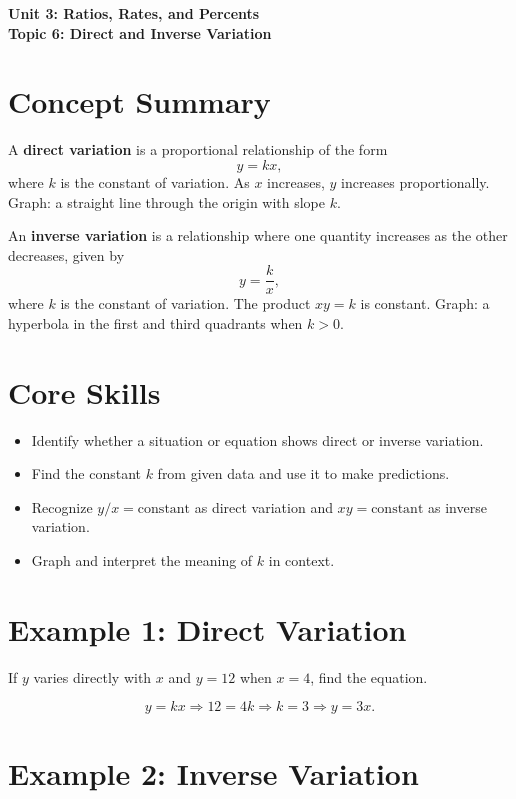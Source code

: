 \documentclass[12pt]{article}
\begin{document}
\begin{center}
    \LARGE \textbf{Unit 3: Ratios, Rates, and Percents} \\[6pt]
    \Large \textbf{Topic 6: Direct and Inverse Variation}
\end{center}

\vspace{1em}

\section*{Concept Summary}

A \textbf{direct variation} is a proportional relationship of the form
\[
y = kx,
\]
where \(k\) is the constant of variation. As \(x\) increases, \(y\) increases proportionally.  
Graph: a straight line through the origin with slope \(k\).

An \textbf{inverse variation} is a relationship where one quantity increases as the other decreases, given by
\[
y = \frac{k}{x},
\]
where \(k\) is the constant of variation. The product \(xy = k\) is constant.  
Graph: a hyperbola in the first and third quadrants when \(k > 0\).

\section*{Core Skills}
\begin{itemize}
  \item Identify whether a situation or equation shows direct or inverse variation.
  \item Find the constant \(k\) from given data and use it to make predictions.
  \item Recognize \(y/x = \text{constant}\) as direct variation and \(xy = \text{constant}\) as inverse variation.
  \item Graph and interpret the meaning of \(k\) in context.
\end{itemize}

\section*{Example 1: Direct Variation}

If \(y\) varies directly with \(x\) and \(y=12\) when \(x=4\), find the equation.

\[
y = kx \Rightarrow 12 = 4k \Rightarrow k = 3 \Rightarrow \boxed{y = 3x}.
\]

\section*{Example 2: Inverse Variation}
\end{document}
